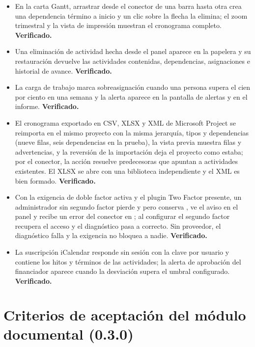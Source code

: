 \documentclass[11pt,a4paper]{article}
\begin{document}
\begin{itemize}
\item En la carta Gantt, arrastrar desde el conector de una barra hasta otra crea una dependencia término a inicio y un clic sobre la flecha la elimina; el zoom trimestral y la vista de impresión muestran el cronograma completo. \textbf{Verificado.}
\item Una eliminación de actividad hecha desde el panel aparece en la papelera y su restauración devuelve las actividades contenidas, dependencias, asignaciones e historial de avance. \textbf{Verificado.}
\item La carga de trabajo marca sobreasignación cuando una persona supera el cien por ciento en una semana y la alerta aparece en la pantalla de alertas y en el informe. \textbf{Verificado.}
\item El cronograma exportado en CSV, XLSX y XML de Microsoft Project se reimporta en el mismo proyecto con la misma jerarquía, tipos y dependencias (nueve filas, seis dependencias en la prueba), la vista previa muestra filas y advertencias, y la reversión de la importación deja el proyecto como estaba; por el conector, la acción  resuelve predecesoras que apuntan a actividades existentes. El XLSX se abre con una biblioteca independiente y el XML es bien formado. \textbf{Verificado.}
\item Con la exigencia de doble factor activa y el plugin Two Factor presente, un administrador sin segundo factor pierde  y  pero conserva , ve el aviso en el panel y recibe un error del conector en ; al configurar el segundo factor recupera el acceso y el diagnóstico pasa a correcto. Sin proveedor, el diagnóstico falla y la exigencia no bloquea a nadie. \textbf{Verificado.}
\item La suscripción iCalendar responde sin sesión con la clave por usuario y contiene los hitos y términos de las actividades; la alerta de aprobación del financiador aparece cuando la desviación supera el umbral configurado. \textbf{Verificado.}
\end{itemize}

\section{Criterios de aceptación del módulo documental (0.3.0)}
\end{document}
